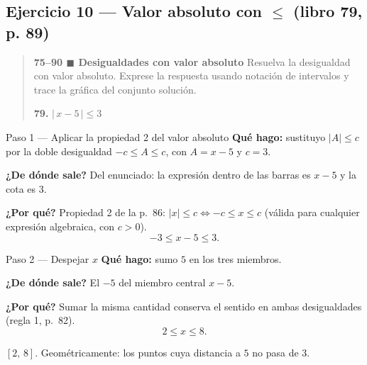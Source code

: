 \documentclass[11pt]{article}
\begin{document}
\subsection*{Ejercicio 10 --- Valor absoluto con $\le$ (libro 79, p. 89)}

\begin{quote}
\textbf{75--90 $\blacksquare$ Desigualdades con valor absoluto} \; Resuelva la desigualdad con valor absoluto. Exprese la respuesta usando notación de intervalos y trace la gráfica del conjunto solución.

\textbf{79.} $|\,x-5\,|\le 3$
\end{quote}

\begin{paso}{Paso 1 --- Aplicar la propiedad 2 del valor absoluto}
\textbf{Qué hago:} sustituyo $|A|\le c$ por la doble desigualdad $-c\le A\le c$, con $A=x-5$ y $c=3$.

\textbf{¿De dónde sale?} Del enunciado: la expresión dentro de las barras es $x-5$ y la cota es $3$.

\textbf{¿Por qué?} Propiedad 2 de la p.~86: $|x|\le c \iff -c\le x\le c$ (válida para cualquier expresión algebraica, con $c>0$).
\[
-3\le x-5\le 3.
\]
\end{paso}

\begin{paso}{Paso 2 --- Despejar $x$}
\textbf{Qué hago:} sumo $5$ en los tres miembros.

\textbf{¿De dónde sale?} El $-5$ del miembro central $x-5$.

\textbf{¿Por qué?} Sumar la misma cantidad conserva el sentido en ambas desigualdades (regla 1, p.~82).
\[
2\le x\le 8.
\]
\end{paso}

\begin{center}
\end{center}

\begin{resp}
$[2,\,8]$. Geométricamente: los puntos cuya distancia a $5$ no pasa de $3$.
\end{resp}
\end{document}
